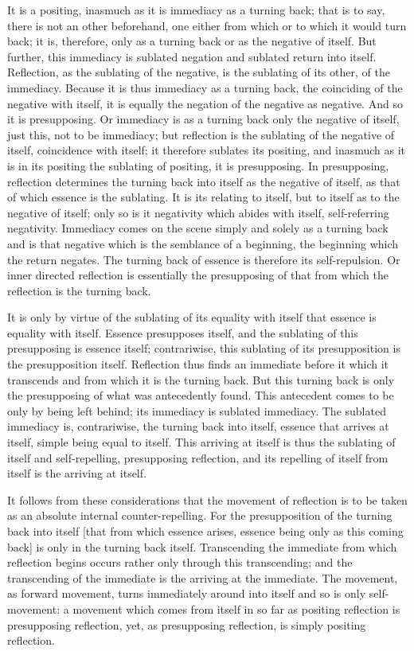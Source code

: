 It is a positing, inasmuch as it is
immediacy as a turning back;
that is to say, there is not an other beforehand,
one either from which or to which it would turn back;
it is, therefore, only as a turning back
or as the negative of itself.
But further, this immediacy is sublated negation
and sublated return into itself.
Reflection, as the sublating of the negative, is
the sublating of its other, of the immediacy.
Because it is thus immediacy as a turning back,
the coinciding of the negative with itself,
it is equally the negation of the negative as negative.
And so it is presupposing.
Or immediacy is as a turning back
only the negative of itself,
just this, not to be immediacy;
but reflection is the sublating
of the negative of itself,
coincidence with itself;
it therefore sublates its positing,
and inasmuch as it is in its positing
the sublating of positing, it is presupposing.
In presupposing, reflection determines the turning back
into itself as the negative of itself,
as that of which essence is the sublating.
It is its relating to itself,
but to itself as to the negative of itself;
only so is it negativity which abides with itself,
self-referring negativity.
Immediacy comes on the scene simply and solely
as a turning back and is that negative
which is the semblance of a beginning,
the beginning which the return negates.
The turning back of essence is therefore its self-repulsion.
Or inner directed reflection is essentially
the presupposing of that from which
the reflection is the turning back.

It is only by virtue of the sublating of its equality with itself
that essence is equality with itself.
Essence presupposes itself, and the sublating of
this presupposing is essence itself;
contrariwise, this sublating of its presupposition is
the presupposition itself.
Reflection thus finds an immediate before it
which it transcends and from which it is the turning back.
But this turning back is only the presupposing of
what was antecedently found.
This antecedent comes to be only by being left behind;
its immediacy is sublated immediacy.
The sublated immediacy is, contrariwise, the turning
back into itself,
essence that arrives at itself, simple being equal to itself.
This arriving at itself is thus the sublating of itself
and self-repelling, presupposing reflection,
and its repelling of itself from itself is
the arriving at itself.

It follows from these considerations that
the movement of reflection is to be taken as
an absolute internal counter-repelling.
For the presupposition of
the turning back into itself
[that from which essence arises,
essence being only as this coming back]
is only in the turning back itself.
Transcending the immediate from which reflection begins
occurs rather only through this transcending;
and the transcending of the immediate is
the arriving at the immediate.
The movement, as forward movement, turns immediately
around into itself and so is only self-movement:
a movement which comes from itself in so far as
positing reflection is presupposing reflection, yet,
as presupposing reflection, is simply positing reflection.

